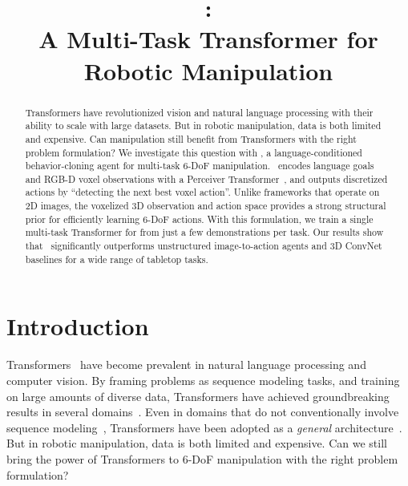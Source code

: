 \title{\modelfullns: \\ A Multi-Task Transformer for Robotic Manipulation}



\maketitle

\vspace{-1.0cm}
\begin{abstract}
    Transformers have revolutionized vision and natural language processing with their ability to scale with large datasets. But in robotic manipulation, data is both limited and expensive.  
    Can manipulation still benefit from Transformers with the right problem formulation?
    We investigate this question with \model, a language-conditioned behavior-cloning agent for multi-task 6-DoF manipulation. 
    \model~encodes language goals and RGB-D voxel observations with a Perceiver Transformer~\citep{jaegle2021perceiver}, and outputs discretized actions by ``detecting the next best voxel action''. 
    Unlike frameworks that operate on 2D images, the voxelized 3D  observation and action space provides a strong structural prior for efficiently learning 6-DoF actions.
    With this formulation, we train a single multi-task Transformer for  from just a few demonstrations per task.
    Our results show that \model~significantly outperforms unstructured image-to-action agents and 3D ConvNet baselines for a wide range of tabletop tasks.  
    
    
\end{abstract}


\section{Introduction}

Transformers~\citep{vaswani2017attention} have become  prevalent in natural language processing and computer vision. By framing problems as sequence modeling tasks, and training on large amounts of diverse data, Transformers have achieved groundbreaking results in several domains~\citep{brown2020language,dosovitskiy2020image,jumper2021highly,vinyals2019alphastar}. Even in domains that do not conventionally involve sequence modeling~\citep{chen2021pix2seq,chen2021decision}, Transformers have been adopted as a \textit{general} architecture~\citep{reed2022generalist}. But in robotic manipulation, data is both limited and expensive. 
Can we still bring the power of Transformers to 6-DoF manipulation with the right problem formulation?

